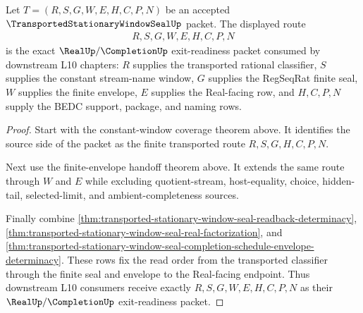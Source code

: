 \begin{theorem}
\label{thm:transported-stationary-window-seal-real-completion-exit-readiness}
Let $T=(R,S,G,W,E,H,C,P,N)$ be an accepted $\TransportedStationaryWindowSealUp$ packet. The displayed route
$$
\begin{aligned}
  R,S,G,W,E,H,C,P,N
\end{aligned}
$$
is the exact $\RealUp/\CompletionUp$ exit-readiness packet consumed by downstream L10 chapters: $R$ supplies the transported rational classifier, $S$ supplies the constant stream-name window, $G$ supplies the RegSeqRat finite seal, $W$ supplies the finite envelope, $E$ supplies the Real-facing row, and $H,C,P,N$ supply the BEDC support, package, and naming rows.
\end{theorem}
\begin{proof}
Start with the constant-window coverage theorem above. It identifies the source side of the packet as the finite transported route $R,S,G,H,C,P,N$.

Next use the finite-envelope handoff theorem above. It extends the same route through $W$ and $E$ while excluding quotient-stream, host-equality, choice, hidden-tail, selected-limit, and ambient-completeness sources.

Finally combine \autoref{thm:transported-stationary-window-seal-readback-determinacy}, \autoref{thm:transported-stationary-window-seal-real-factorization}, and \autoref{thm:transported-stationary-window-seal-completion-schedule-envelope-determinacy}. These rows fix the read order from the transported classifier through the finite seal and envelope to the Real-facing endpoint. Thus downstream L10 consumers receive exactly $R,S,G,W,E,H,C,P,N$ as their $\RealUp/\CompletionUp$ exit-readiness packet.
\end{proof}

